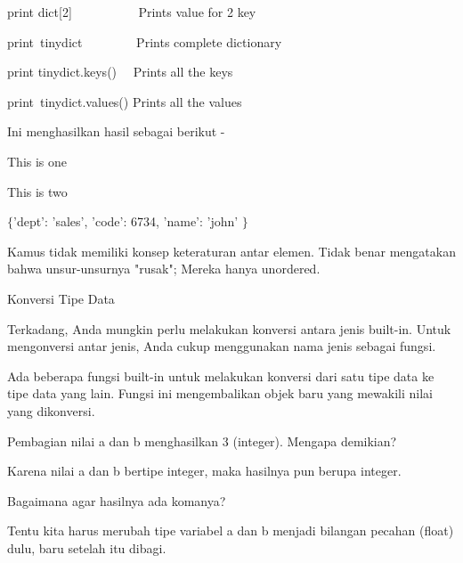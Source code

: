 \noindent 
print dict[2]~~~~~~~~~~  Prints value for 2 key \par
\noindent 
print~tinydict~~~~~~~~   Prints complete dictionary \par
\noindent 
print tinydict.keys()~~  Prints all the keys \par
\noindent 
print~tinydict.values()   Prints all the values \par
\noindent 
Ini menghasilkan hasil sebagai berikut - \par
\noindent 
This is one \par
\noindent 
This is two \par
\noindent 
 $  \{  $'dept': 'sales', 'code': 6734, 'name': 'john' $  \}  $ \par
{} \par
{} \par
\vspace{12pt}
\noindent 
Kamus tidak memiliki konsep keteraturan antar elemen. $  $Tidak benar mengatakan bahwa unsur-unsurnya "rusak"; $  $Mereka hanya unordered. \par
\vspace{12pt}
\noindent 
Konversi Tipe Data \par
\vspace{12pt}
\noindent 
Terkadang, Anda mungkin perlu melakukan konversi antara jenis built-in. $  $Untuk mengonversi antar jenis, Anda cukup menggunakan nama jenis sebagai fungsi. \par
\noindent 
Ada beberapa fungsi built-in untuk melakukan konversi dari satu tipe data ke tipe data yang lain. $  $Fungsi ini mengembalikan objek baru yang mewakili nilai yang dikonversi. \par
\vspace{12pt}
\noindent 
Pembagian nilai $  $a $  $dan $  $b $  $menghasilkan $  $3 $  $(integer). Mengapa demikian? \par
\vspace{12pt}
\noindent 
Karena nilai $  $a $  $dan $  $b $  $bertipe integer, maka hasilnya pun berupa integer. \par
\vspace{12pt}
\noindent 
Bagaimana agar hasilnya ada komanya? \par
\vspace{12pt}
\noindent 
Tentu kita harus merubah tipe variabel $  $a $  $dan $  $b $  $menjadi bilangan pecahan (float) dulu, baru setelah itu dibagi. \par
\vspace{12pt}
